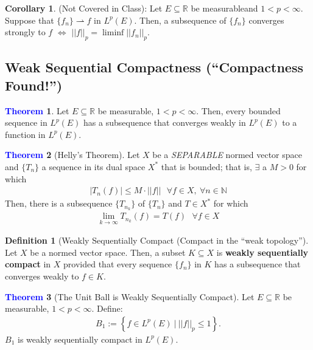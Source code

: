 \documentclass[11pt]{article}
\theoremstyle{definition}
\theoremstyle{definition}
\newcommand{\R}[0]{\mathbb{R}}
\newcommand{\EinR}[0]{Let $E \subseteq \R$ be measurable}
\newcommand{\warrow}[0]{\rightharpoonup}
\newcommand{\fcvw}[0]{ \{f_n \} \warrow f \text{ in } L^p(E)}
\newcommand{\sets}[2]{ \left\{ #1\ |\ #2 \right\}}
\newtheorem{theorem}{\textcolor{blue}{Theorem}}
\newtheorem{corollary}{Corollary}
\theoremstyle{definition}
\newtheorem{definition}{\textcolor{OliveGreen}{Definition}}
\theoremstyle{remark}
\begin{document}
\begin{corollary} (Not Covered in Class): \EinR and $1 < p < \infty$. Suppose that $\fcvw$. Then, a subsequence of $\{f_n \}$ converges strongly to $f$ $\iff$ $||f||_p = \liminf||f_n||_p$. 
\end{corollary}

\subsection{Weak Sequential Compactness (``Compactness Found!'')} 

\begin{theorem}
	\EinR, $1 < p < \infty$. Then, every bounded sequence in $L^p(E)$ has a subsequence that converges weakly in $L^p(E)$ to a function in $L^p(E)$. 
\end{theorem}

\begin{theorem}[Helly's Theorem]
	Let $X$ be a \emph{SEPARABLE} normed vector space and $\{ T_n \}$ a sequence in its dual space $X^*$ that is bounded; that is, $\exists$ a $M > 0$ for which 
	\begin{align*}
		|T_n(f)| \leq M \cdot ||f|| \text{ 		} \forall f \in X,\ \forall n \in \mathbb{N} 	
	\end{align*}
	Then, there is a subsequence $\{ T_{n_k} \}$ of $\{ T_n \}$ and $T \in X^*$ for which 
	\begin{align}
		\lim_{k \rightarrow \infty} T_{n_k} (f) = T(f) \text{ 		} \forall f \in X 
	\end{align}
\end{theorem}

\begin{definition}[Weakly Sequentially Compact (Compact in the ``weak topology''] Let $X$ be a normed vector space. Then, a subset $K \subseteq X$ is \textbf{weakly sequentially compact} in $X$ provided that every sequence $\{ f_n \}$  in $K$ has a subsequence that converges weakly to $f \in K$. 
\end{definition}

\begin{theorem}[The Unit Ball is Weakly Sequentially Compact] \EinR, $1 < p < \infty$. Define: 
\begin{align}
	B_1:= \sets{f \in L^p(E)}{||f||_p \leq 1}. 
\end{align}
$B_1$ is weakly sequentially compact in $L^p(E)$. 

	
\end{theorem}
\end{document}
